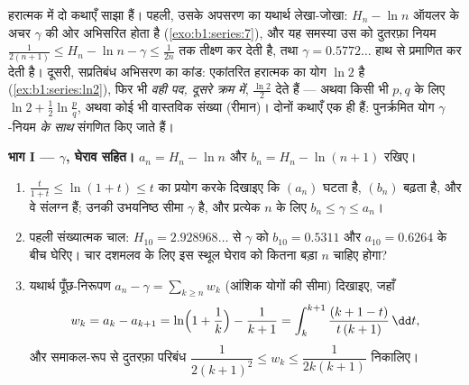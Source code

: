 \begin{problem}[{सप्ताहांत समस्या --- $H_n = \ln n + \gamma +
\frac{1}{2n} + O(n^{-2})$, और $1 - \frac12 +
\frac13 - \dots$ को पुनर्क्रमित करके $\frac{\ln 2}{2}$}]
\label{pb:b1:series:1}
हरात्मक  में दो कथाएँ साझा हैं। पहली, उसके अपसरण का यथार्थ लेखा-जोखा:
$H_n - \ln n$ ऑयलर के अचर $\gamma$ की ओर अभिसरित होता है
(\cref{exo:b1:series:7}), और यह समस्या उस  को दुतरफ़ा नियम
$\frac{1}{2(n+1)} \leq H_n - \ln n - \gamma \leq \frac{1}{2n}$ तक तीक्ष्ण कर
देती है, तथा $\gamma = 0.5772\dots$ हाथ से प्रमाणित कर देती है। दूसरी,
सप्रतिबंध अभिसरण का कांड: एकांतरित हरात्मक  का योग $\ln 2$ है
(\cref{ex:b1:series:ln2}), फिर भी \emph{वही पद, दूसरे क्रम में}, $\frac{\ln
2}{2}$ देते हैं --- अथवा किसी भी $p, q$ के लिए $\ln 2 + \frac12\ln\frac pq$,
अथवा कोई भी वास्तविक संख्या (रीमान)। दोनों कथाएँ एक ही हैं: पुनर्क्रमित योग
$\gamma$-नियम \emph{के साथ} संगणित किए जाते हैं।

\medskip \noindent\textbf{भाग I --- $\gamma$, घेराव सहित।} $a_n = H_n - \ln
n$ और $b_n = H_n - \ln(n+1)$ रखिए।
\begin{enumerate}
  \item $\frac{t}{1+t} \leq \ln(1 + t) \leq t$ का प्रयोग करके दिखाइए कि
  $(a_n)$ घटता है, $(b_n)$ बढ़ता है, और वे संलग्न हैं; उनकी उभयनिष्ठ सीमा
  $\gamma$ है, और प्रत्येक $n$ के लिए $b_n \leq \gamma \leq a_n$।
  \item पहली संख्यात्मक चाल: $H_{10} = 2.928968\dots$ से $\gamma$ को $b_{10}
  = 0.5311$ और $a_{10} = 0.6264$ के बीच घेरिए। चार दशमलव के लिए इस स्थूल
  घेराव को कितना बड़ा $n$ चाहिए होगा?
  \item यथार्थ पूँछ-निरूपण $a_n - \gamma = \sum_{k \geq n} w_k$ (आंशिक योगों
  की सीमा) दिखाइए, जहाँ
        \[
        w_k = a_k - a_{k+1}
        = \ln\Bigl(1 + \frac1k\Bigr) - \frac{1}{k+1}
        = \int_k^{k+1} \frac{(k + 1 - t)}{t\,(k+1)}\,\dd t ,
        \]
        और समाकल-रूप से दुतरफ़ा परिबंध $\dfrac{1}{2(k+1)^2} \leq w_k \leq
        \dfrac{1}{2k(k+1)}$ निकालिए।
\end{enumerate}


\end{problem}
